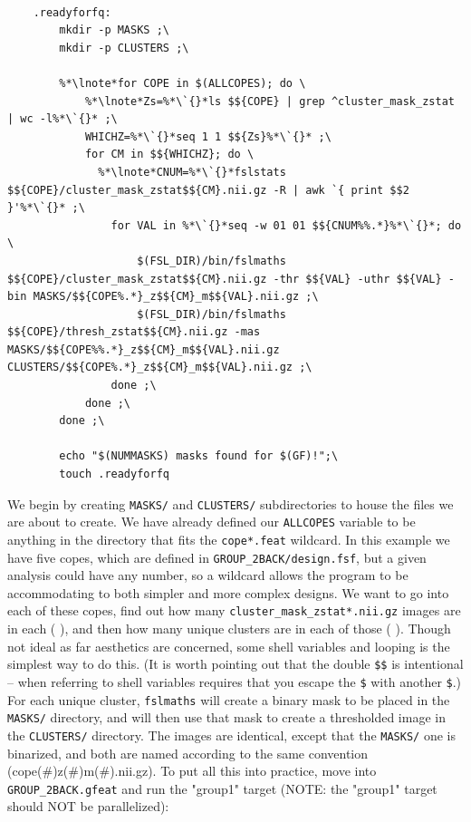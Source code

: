 \begin{lstlisting}

	.readyforfq:
		mkdir -p MASKS ;\
		mkdir -p CLUSTERS ;\
		
		%*\lnote*for COPE in $(ALLCOPES); do \
			%*\lnote*Zs=%*\`{}*ls $${COPE} | grep ^cluster_mask_zstat | wc -l%*\`{}* ;\
			WHICHZ=%*\`{}*seq 1 1 $${Zs}%*\`{}* ;\
			for CM in $${WHICHZ}; do \
			  %*\lnote*CNUM=%*\`{}*fslstats $${COPE}/cluster_mask_zstat$${CM}.nii.gz -R | awk `{ print $$2 }'%*\`{}* ;\
				for VAL in %*\`{}*seq -w 01 01 $${CNUM%%.*}%*\`{}*; do \
					$(FSL_DIR)/bin/fslmaths $${COPE}/cluster_mask_zstat$${CM}.nii.gz -thr $${VAL} -uthr $${VAL} -bin MASKS/$${COPE%.*}_z$${CM}_m$${VAL}.nii.gz ;\
					$(FSL_DIR)/bin/fslmaths $${COPE}/thresh_zstat$${CM}.nii.gz -mas MASKS/$${COPE%%.*}_z$${CM}_m$${VAL}.nii.gz CLUSTERS/$${COPE%.*}_z$${CM}_m$${VAL}.nii.gz ;\
				done ;\
			done ;\
		done ;\
		
		echo "$(NUMMASKS) masks found for $(GF)!";\
		touch .readyforfq
\end{lstlisting}

We begin by creating \texttt{MASKS/} and \texttt{CLUSTERS/} subdirectories to house the files we are about to create.  We have already defined our \texttt{ALLCOPES} variable to be anything in the directory that fits the \texttt{cope*.feat} wildcard. In this example we have five copes, which are defined in \texttt{GROUP_2BACK/design.fsf}, but a given analysis could have any number, so a wildcard allows the program to be accommodating to both simpler and more complex designs.  We want \maken{} to go into each of these copes, find out how many \texttt{cluster_mask_zstat*.nii.gz} images are in each ( ), and then how many unique clusters are in each of those ( ). Though not ideal as far aesthetics are concerned, some shell variables and looping is the simplest way to do this.  (It is worth pointing out that the double \texttt{\$\$} is intentional -- when referring to shell variables \maken{} requires that you escape the \texttt{\$} with another \texttt{\$}.) For each unique cluster, \texttt{fslmaths} will create a binary mask to be placed in the \texttt{MASKS/} directory, and will then use that mask to create a thresholded image in the \texttt{CLUSTERS/} directory. The images are identical, except that the \texttt{MASKS/} one is binarized, and both are named according to the same convention (cope(\#)z(\#)m(\#).nii.gz). To put all this into practice, move into \texttt{GROUP_2BACK.gfeat} and run the "group1" target (NOTE: the "group1" target should NOT be parallelized):

